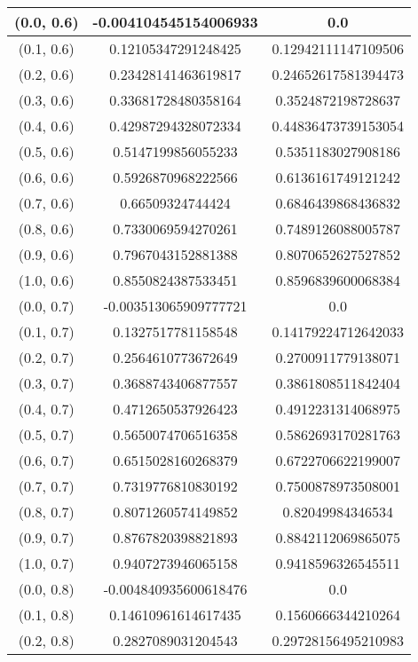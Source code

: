 \begin{table}[H]
\begin{tabular}{|c|c|c|}
\hline
(0.0, 0.6) & -0.004104545154006933 & 0.0 \\
\hline
(0.1, 0.6) & 0.12105347291248425 & 0.12942111147109506 \\
\hline
(0.2, 0.6) & 0.23428141463619817 & 0.24652617581394473 \\
\hline
(0.3, 0.6) & 0.33681728480358164 & 0.3524872198728637 \\
\hline
(0.4, 0.6) & 0.42987294328072334 & 0.44836473739153054 \\
\hline
(0.5, 0.6) & 0.5147199856055233 & 0.5351183027908186 \\
\hline
(0.6, 0.6) & 0.5926870968222566 & 0.6136161749121242 \\
\hline
(0.7, 0.6) & 0.66509324744424 & 0.6846439868436832 \\
\hline
(0.8, 0.6) & 0.7330069594270261 & 0.7489126088005787 \\
\hline
(0.9, 0.6) & 0.7967043152881388 & 0.8070652627527852 \\
\hline
(1.0, 0.6) & 0.8550824387533451 & 0.8596839600068384 \\
\hline
\hline
(0.0, 0.7) & -0.003513065909777721 & 0.0 \\
\hline
(0.1, 0.7) & 0.1327517781158548 & 0.14179224712642033 \\
\hline
(0.2, 0.7) & 0.2564610773672649 & 0.2700911779138071 \\
\hline
(0.3, 0.7) & 0.3688743406877557 & 0.3861808511842404 \\
\hline
(0.4, 0.7) & 0.4712650537926423 & 0.4912231314068975 \\
\hline
(0.5, 0.7) & 0.5650074706516358 & 0.5862693170281763 \\
\hline
(0.6, 0.7) & 0.6515028160268379 & 0.6722706622199007 \\
\hline
(0.7, 0.7) & 0.7319776810830192 & 0.7500878973508001 \\
\hline
(0.8, 0.7) & 0.8071260574149852 & 0.82049984346534 \\
\hline
(0.9, 0.7) & 0.8767820398821893 & 0.8842112069865075 \\
\hline
(1.0, 0.7) & 0.9407273946065158 & 0.9418596326545511 \\
\hline
\hline
(0.0, 0.8) & -0.004840935600618476 & 0.0 \\
\hline
(0.1, 0.8) & 0.14610961614617435 & 0.1560666344210264 \\
\hline
(0.2, 0.8) & 0.2827089031204543 & 0.29728156495210983 \\

\end{tabular}
\end{table}
